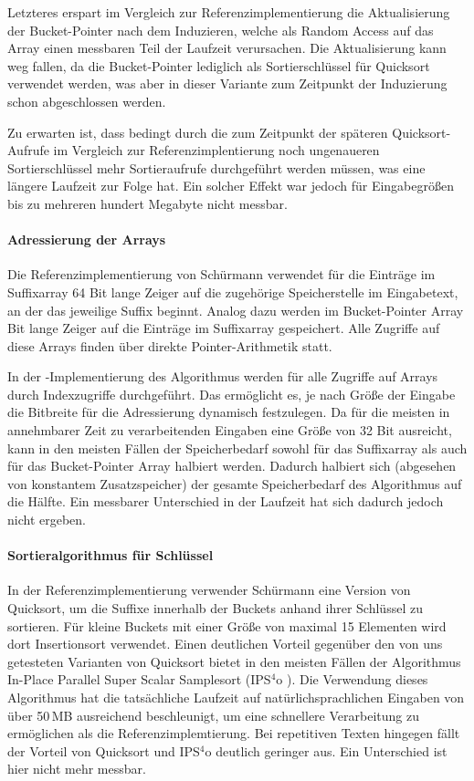 Letzteres erspart im Vergleich zur Referenzimplementierung die Aktualisierung der Bucket-Pointer nach dem Induzieren, welche als Random Access auf das Array einen messbaren Teil der Laufzeit verursachen. Die Aktualisierung kann weg fallen, da die Bucket-Pointer lediglich als Sortierschlüssel für Quicksort verwendet werden, was aber in dieser Variante zum Zeitpunkt der Induzierung schon abgeschlossen werden.\par
Zu erwarten ist, dass bedingt durch die zum Zeitpunkt der späteren Quicksort-Aufrufe im Vergleich zur Referenzimplentierung noch ungenaueren Sortierschlüssel mehr Sortieraufrufe durchgeführt werden müssen, was eine längere Laufzeit zur Folge hat. Ein solcher Effekt war jedoch für Eingabegrößen bis zu mehreren hundert Megabyte nicht messbar.

\paragraph{Adressierung der Arrays}
Die Referenzimplementierung von Schürmann verwendet für die Einträge im Suffixarray 64 Bit lange Zeiger auf die zugehörige Speicherstelle im Eingabetext, an der das jeweilige Suffix beginnt. Analog dazu werden im Bucket-Pointer Array  Bit lange Zeiger auf die Einträge im Suffixarray gespeichert. Alle Zugriffe auf diese Arrays finden über direkte Pointer-Arithmetik statt.\par
In der \sacabench-Implementierung des Algorithmus werden für alle Zugriffe auf Arrays durch Indexzugriffe durchgeführt. Das ermöglicht es, je nach Größe der Eingabe die Bitbreite für die Adressierung dynamisch festzulegen. Da für die meisten in annehmbarer Zeit zu verarbeitenden Eingaben eine Größe von 32 Bit ausreicht, kann in den meisten Fällen der Speicherbedarf sowohl für das Suffixarray als auch für das Bucket-Pointer Array halbiert werden. Dadurch halbiert sich (abgesehen von konstantem Zusatzspeicher) der gesamte Speicherbedarf des Algorithmus auf die Hälfte. Ein messbarer Unterschied in der Laufzeit hat sich dadurch jedoch nicht ergeben.

\paragraph{Sortieralgorithmus für Schlüssel}
In der Referenzimplementierung verwender Schürmann eine Version von Quicksort, um die Suffixe innerhalb der Buckets anhand ihrer Schlüssel zu sortieren. Für kleine Buckets mit einer Größe von maximal 15 Elementen wird dort Insertionsort verwendet. Einen deutlichen Vorteil gegenüber den von uns getesteten Varianten von Quicksort bietet in den meisten Fällen der Algorithmus In-Place Parallel Super Scalar Samplesort (IPS\(^4\)o \cite{axtmann2017}). Die Verwendung dieses Algorithmus hat die tatsächliche Laufzeit auf natürlichsprachlichen Eingaben von über 50\,MB ausreichend beschleunigt, um eine schnellere Verarbeitung zu ermöglichen als die Referenzimplemtierung. Bei repetitiven Texten hingegen fällt der Vorteil von Quicksort und IPS\(^4\)o deutlich geringer aus. Ein Unterschied ist hier nicht mehr messbar.
